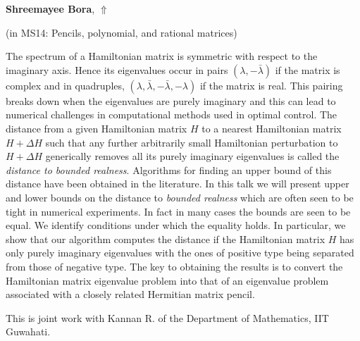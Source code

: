 \documentclass[ILAS2025-program.tex]{subfiles}
\begin{document}
     \hypertarget{down0215}{}\begin{ilasabstract}
    
    \textbf{Shreemayee Bora},  \hfill \hyperlink{up0215}{$\Uparrow$}
    
    (in {\color{mstitle}MS14: Pencils, polynomial, and rational matrices})
        
        \mtskip
    The spectrum of a Hamiltonian matrix is symmetric with respect to the imaginary axis. Hence its eigenvalues occur in pairs $(\lambda, -\bar{\lambda})$ if the matrix is complex and in quadruples, $(\lambda, \bar{\lambda}, -\bar{\lambda},-\lambda)$ if the matrix is real. This pairing breaks down when the eigenvalues are purely imaginary and this can lead to numerical challenges in computational methods used in optimal control.  The distance from a given Hamiltonian matrix $H$ to a nearest Hamiltonian matrix $H + \Delta H$ such that any further arbitrarily small Hamiltonian perturbation to $H + \Delta H$ generically removes all its purely imaginary eigenvalues is called the \emph{distance to bounded realness}. Algorithms for finding an upper bound of this distance have been obtained in the literature. In this talk we will present upper and lower bounds on the distance to \emph{bounded realness} which are often seen to be tight in numerical experiments. In fact in many cases the bounds are seen to be equal. We identify conditions under which the equality holds. In particular, we show that our algorithm computes the distance if the Hamiltonian matrix $H$ has only purely imaginary eigenvalues with the ones of positive type being separated from those of negative type. The key to obtaining the results is to convert the Hamiltonian matrix eigenvalue problem into that of an eigenvalue problem associated with a closely related Hermitian matrix pencil.

This is joint work with Kannan R. of the Department of Mathematics, IIT Guwahati. 
\end{ilasabstract}
\end{document}
